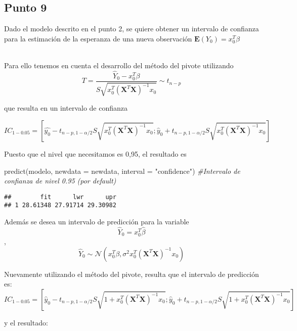 \documentclass[
]{article}
\newenvironment{Shaded}{\begin{snugshade}}{\end{snugshade}}
\newcommand{\AttributeTok}[1]{\textcolor[rgb]{0.77,0.63,0.00}{#1}}
\newcommand{\CommentTok}[1]{\textcolor[rgb]{0.56,0.35,0.01}{\textit{#1}}}
\newcommand{\FunctionTok}[1]{\textcolor[rgb]{0.00,0.00,0.00}{#1}}
\newcommand{\NormalTok}[1]{#1}
\newcommand{\StringTok}[1]{\textcolor[rgb]{0.31,0.60,0.02}{#1}}
\begin{document}
\hypertarget{punto-9}{%
\subsection{Punto 9}\label{punto-9}}

Dado el modelo descrito en el punto 2, se quiere obtener un intervalo de
confianza para la estimación de la esperanza de una nueva observación
\(\mathbf{E}\left(Y_{0}\right)=x_{0}^{T} \beta\)\\
\strut \\
Para ello tenemos en cuenta el desarrollo del método del pivote
utilizando
\[T=\frac{\hat{Y}_{0}-x_{0}^{T} \beta}{S \sqrt{x_{0}^{T}\left(\mathbf{X}^{T} \mathbf{X}\right)^{-1} x_{0}}} \sim t_{n-p}\]

que resulta en un intervalo de confianza

\[ I C_{1-0.05}=\left[\hat{y_{0}}-t_{n-p, 1-\alpha / 2} S \sqrt{x_{0}^{T}\left(\mathbf{X}^{T} \mathbf{X}\right)^{-1} x_{0}} ; \hat{y}_{0}+t_{n-p, 1-\alpha / 2} S \sqrt{x_{0}^{T}\left(\mathbf{X}^{T} \mathbf{X}\right)^{-1} x_{0}}\right] \]

Puesto que el nivel que necesitamos es 0,95, el resultado es

\begin{Shaded}
\begin{Highlighting}[]
\FunctionTok{predict}\NormalTok{(modelo, }\AttributeTok{newdata =}\NormalTok{ newdata, }\AttributeTok{interval =} \StringTok{"confidence"}\NormalTok{) }\CommentTok{\#Intervalo de confianza de nivel 0.95 (por default) }
\end{Highlighting}
\end{Shaded}

\begin{verbatim}
##        fit      lwr      upr
## 1 28.61348 27.91714 29.30982
\end{verbatim}

Además se desea un intervalo de predicción para la variable
\[\hat{Y}_{0}=x_{0}^{T} \hat{\beta}\],
\[ \hat{Y}_{0} \sim \mathcal{N}\left(x_{0}^{T} \beta, \sigma^{2} x_{0}^{T}\left(\mathbf{X}^{T} \mathbf{X}\right)^{-1} x_{0}\right)\]

Nuevamente utilizando el método del pivote, resulta que el intervalo de
predicción es:
\[I C_{1-0.05}=\left[\hat{y}_{0}-t_{n-p, 1-\alpha / 2} S \sqrt{1+x_{0}^{T}\left(\mathbf{X}^{T} \mathbf{X}\right)^{-1} x_{0}} ; \hat{y}_{0}+t_{n-p, 1-\alpha / 2} S \sqrt{1+x_{0}^{T}\left(\mathbf{X}^{T} \mathbf{X}\right)^{-1} x_{0}}\right] \]

y el resultado:
\end{document}
